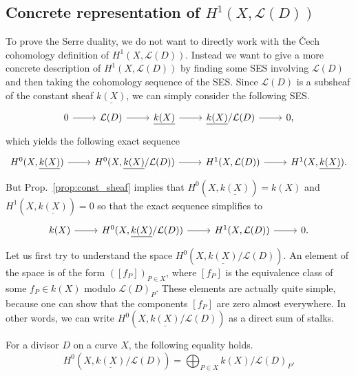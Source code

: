 \subsection{Concrete representation of $H^{1}(X,\mathcal{L}(D))$}
To prove the Serre duality, we do not want to directly work with the \v Cech
cohomology definition of $H^{1}(X,\mathcal{L}(D))$.
Instead we want to give a more concrete description of
$H^{1}(X,\mathcal{L}(D))$ by finding some SES involving $\mathcal{L}(D)$
and then taking the cohomology sequence of the SES. Since $\mathcal{L}(D)$ is
a subsheaf of the constant sheaf $\underline{k(X)}$, we can simply consider
the following SES.
\[
  \begin{tikzcd}
    0\rar & \mathcal{L}(D)\rar & \underline{k(X)}\rar
    & \underline{k(X)}/\mathcal{L}(D)\rar & 0,
  \end{tikzcd}
\]
which yields the following exact sequence
\[
  \begin{tikzcd}
    H^{0}(X,\underline{k(X)})\rar & H^{0}(X,\underline{k(X)}
    /\mathcal{L}(D))\rar & H^{1}(X,\mathcal{L}(D))\rar
    & H^{1}(X,\underline{k(X)}).
  \end{tikzcd}
\]
But Prop.~\ref{prop:const_sheaf} implies that
$H^{0}(X,\underline{k(X)})=k(X)$ and $H^{1}(X,\underline{k(X)})=0$
so that the exact sequence simplifies to
\begin{equation}\label{eq:repartition_ses}
  \begin{tikzcd}
    k(X)\rar & H^{0}(X,\underline{k(X)}/\mathcal{L}(D))\rar
    & H^{1}(X,\mathcal{L}(D))\rar & 0.
  \end{tikzcd}
\end{equation}
Let us first try to understand the space
$H^{0}(X,\underline{k(X)}/\mathcal{L}(D))$. An element of the space
is of the form $([f_{P}])_{P\in X}$, where $[f_{P}]$ is the equivalence
class of some $f_{P}\in k(X)$ modulo $\mathcal{L}(D)_{P}$.
These elements are actually quite simple, because one can show that the
components $[f_{P}]$ are zero almost everywhere.
In other words, we can write $H^{0}(X,\underline{k(X)}/\mathcal{L}(D))$ as a
direct sum of stalks.
\begin{lemm}
  For a divisor $D$ on a curve $X$, the following equality holds.
  \[
    H^{0}(X,\underline{k(X)}/\mathcal{L}(D))=\bigoplus_{P\in X}
    k(X)/\mathcal{L}(D)_{P}.
  \]
\end{lemm}
